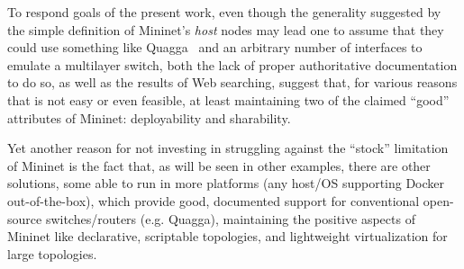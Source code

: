 To respond goals of the present work, even though the generality suggested by the simple definition of Mininet's \emph{host} nodes may lead one to assume that they could use something like Quagga~\cite{quagga} and an arbitrary number of interfaces to emulate a multilayer switch, both the lack of proper authoritative documentation to do so, as well as the results of Web searching, suggest that, for various reasons that is not easy or even feasible, at least maintaining two of the claimed ``good'' attributes of Mininet: deployability and sharability.

Yet another reason for not investing in struggling against the ``stock'' limitation of Mininet is the fact that, as will be seen in other examples, there are other solutions, some able to run in more platforms (any host/OS supporting Docker out-of-the-box), which provide good, documented support for conventional open-source switches/routers (e.g. Quagga), maintaining the positive aspects of Mininet like declarative, scriptable topologies, and lightweight virtualization for large topologies.

